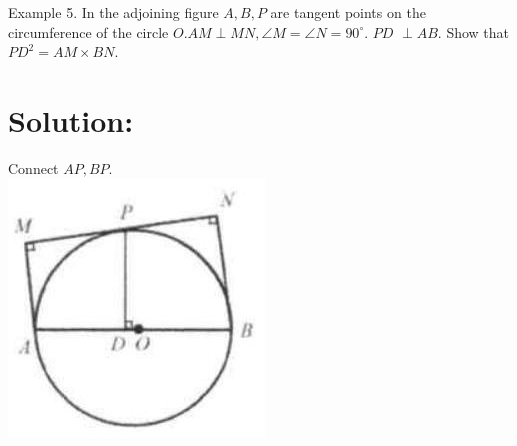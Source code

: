 \documentclass[10pt]{article}
\begin{document}
Example 5. In the adjoining figure \(A, B, P\) are tangent points on the circumference of the circle \(O . A M \perp M N, \angle M=\angle N=90^{\circ}\). \(P D\) \(\perp A B\). Show that \(P D^{2}=A M \times B N\).

\section*{Solution:}
Connect \(A P, B P\).\\
\includegraphics[max width=\textwidth, center]{2025_04_17_97bc1f7e44d93c271a88g-148(5)}
\end{document}
